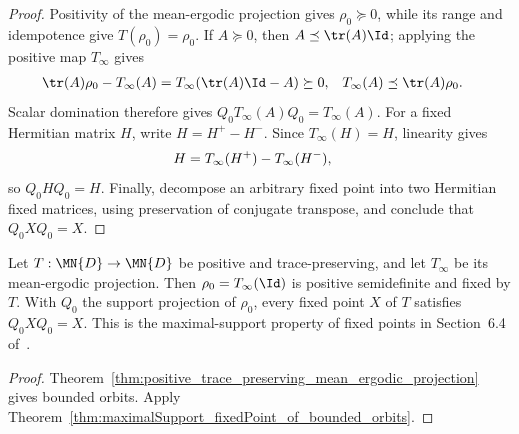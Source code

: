 \begin{proof}
    \leanok
    Positivity of the mean-ergodic projection gives $\rho_0\succeq0$, while
    its range and idempotence give $T(\rho_0)=\rho_0$. If $A\succeq0$, then
    $A\preceq\tr(A)\Id$; applying the positive map $T_\infty$ gives
    \begin{align}
        \tr(A)\rho_0-T_\infty(A)
         & =T_\infty\!\left(\tr(A)\Id-A\right)\succeq0,
         &
        T_\infty(A)
         & \preceq\tr(A)\rho_0.
        \notag
    \end{align}
    Scalar domination therefore gives
    $Q_0T_\infty(A)Q_0=T_\infty(A)$. For a fixed Hermitian matrix $H$,
    write $H=H^+-H^-$. Since $T_\infty(H)=H$, linearity gives
    \begin{align}
        H
         & =T_\infty(H^+)-T_\infty(H^-),
        \notag
    \end{align}
    so $Q_0HQ_0=H$. Finally, decompose an arbitrary fixed point into two
    Hermitian fixed matrices, using preservation of conjugate transpose, and
    conclude that $Q_0XQ_0=X$.
\end{proof}

\begin{theorem}%
    \label{thm:maximalSupport_fixedPoint}
    \leanok
    Let $T:\MN{D}\to\MN{D}$ be positive and trace-preserving, and let
    $T_\infty$ be its mean-ergodic projection. Then
    $\rho_0=T_\infty(\Id)$ is positive semidefinite and fixed by $T$. With
    $Q_0$ the support projection of $\rho_0$, every fixed point $X$ of $T$
    satisfies $Q_0XQ_0=X$. This is the maximal-support property of fixed
    points in Section~6.4 of~\cite{Wolf2012Quantum}.
\end{theorem}

\begin{proof}
    \leanok
    Theorem~\ref{thm:positive_trace_preserving_mean_ergodic_projection}
    gives bounded orbits. Apply
    Theorem~\ref{thm:maximalSupport_fixedPoint_of_bounded_orbits}.
\end{proof}

